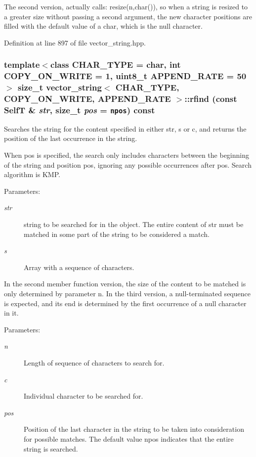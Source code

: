 The second version, actually calls: resize(n,char()), so when a string is resized to a greater size without passing a second argument, the new character positions are filled with the default value of a char, which is the null character. 

Definition at line 897 of file vector\_\-string.hpp.\hypertarget{classvector__string_75a476214f4b7888df557f566aa51b0a}{
\subsubsection[{rfind}]{\setlength{\rightskip}{0pt plus 5cm}template$<$class CHAR\_\-TYPE  = char, int COPY\_\-ON\_\-WRITE = 1, uint8\_\-t APPEND\_\-RATE = 50$>$ size\_\-t {\bf vector\_\-string}$<$ CHAR\_\-TYPE, COPY\_\-ON\_\-WRITE, APPEND\_\-RATE $>$::rfind (const {\bf SelfT} \& {\em str}, \/  size\_\-t {\em pos} = {\tt {\bf npos}}) const}}
\label{classvector__string_75a476214f4b7888df557f566aa51b0a}


Searches the string for the content specified in either str, s or c, and returns the position of the last occurrence in the string.

When pos is specified, the search only includes characters between the beginning of the string and position pos, ignoring any possible occurrences after pos. Search algorithm is KMP.

\begin{Desc}
\item[Parameters:]
\begin{description}
\item[{\em str}]string to be searched for in the object. The entire content of str must be matched in some part of the string to be considered a match. \item[{\em s}]Array with a sequence of characters.\end{description}
\end{Desc}
In the second member function version, the size of the content to be matched is only determined by parameter n. In the third version, a null-terminated sequence is expected, and its end is determined by the first occurrence of a null character in it. \begin{Desc}
\item[Parameters:]
\begin{description}
\item[{\em n}]Length of sequence of characters to search for. \item[{\em c}]Individual character to be searched for. \item[{\em pos}]Position of the last character in the string to be taken into consideration for possible matches. The default value npos indicates that the entire string is searched. \end{description}
\end{Desc}


